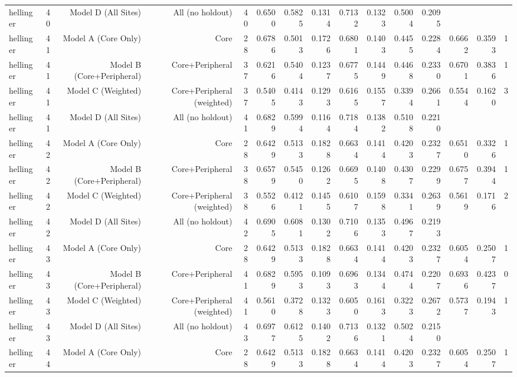 {\begin{longtable}{lrrrrrrrrrrrrrr}
  hellinger & 40 & Model D (All Sites) & All (no holdout) & 40 & 0.6500 & 0.5825 & 0.1314 & 0.7132 & 0.1323 & 0.5004 & 0.2095 &  &  &  \\
  hellinger & 41 & Model A (Core Only) & Core & 28 & 0.6786 & 0.5013 & 0.1726 & 0.6801 & 0.1403 & 0.4455 & 0.2284 & 0.6662 & 0.3593 & 1 \\
  hellinger & 41 & Model B (Core+Peripheral) & Core+Peripheral & 37 & 0.6216 & 0.5404 & 0.1237 & 0.6775 & 0.1449 & 0.4468 & 0.2330 & 0.6701 & 0.3836 & 1 \\
  hellinger & 41 & Model C (Weighted) & Core+Peripheral (weighted) & 37 & 0.5405 & 0.4143 & 0.1293 & 0.6165 & 0.1557 & 0.3394 & 0.2661 & 0.5544 & 0.1620 & 3 \\
  hellinger & 41 & Model D (All Sites) & All (no holdout) & 41 & 0.6829 & 0.5994 & 0.1164 & 0.7184 & 0.1382 & 0.5108 & 0.2210 &  &  &  \\
  hellinger & 42 & Model A (Core Only) & Core & 28 & 0.6429 & 0.5133 & 0.1828 & 0.6634 & 0.1414 & 0.4203 & 0.2327 & 0.6510 & 0.3326 & 1 \\
  hellinger & 42 & Model B (Core+Peripheral) & Core+Peripheral & 38 & 0.6579 & 0.5450 & 0.1262 & 0.6695 & 0.1408 & 0.4307 & 0.2299 & 0.6757 & 0.3944 & 1 \\
  hellinger & 42 & Model C (Weighted) & Core+Peripheral (weighted) & 38 & 0.5526 & 0.4121 & 0.1455 & 0.6107 & 0.1598 & 0.3341 & 0.2639 & 0.5619 & 0.1716 & 2 \\
  hellinger & 42 & Model D (All Sites) & All (no holdout) & 42 & 0.6905 & 0.6081 & 0.1302 & 0.7106 & 0.1353 & 0.4967 & 0.2193 &  &  &  \\
  hellinger & 43 & Model A (Core Only) & Core & 28 & 0.6429 & 0.5133 & 0.1828 & 0.6634 & 0.1414 & 0.4203 & 0.2327 & 0.6054 & 0.2507 & 1 \\
  hellinger & 43 & Model B (Core+Peripheral) & Core+Peripheral & 41 & 0.6829 & 0.5953 & 0.1093 & 0.6963 & 0.1344 & 0.4744 & 0.2207 & 0.6936 & 0.4237 & 0 \\
  hellinger & 43 & Model C (Weighted) & Core+Peripheral (weighted) & 41 & 0.5610 & 0.3728 & 0.1323 & 0.6050 & 0.1613 & 0.3223 & 0.2672 & 0.5737 & 0.1943 & 1 \\
  hellinger & 43 & Model D (All Sites) & All (no holdout) & 43 & 0.6977 & 0.6125 & 0.1402 & 0.7136 & 0.1321 & 0.5024 & 0.2150 &  &  &  \\
  hellinger & 44 & Model A (Core Only) & Core & 28 & 0.6429 & 0.5133 & 0.1828 & 0.6634 & 0.1414 & 0.4203 & 0.2327 & 0.6054 & 0.2507 & 1 \\

\end{longtable}}
